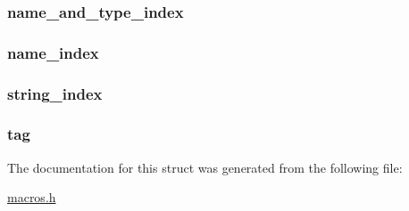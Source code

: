 \subsubsection[{name\+\_\+and\+\_\+type\+\_\+index}]{ name\+\_\+and\+\_\+type\+\_\+index}\label{structcp__info_adec52fa6971122714e8d390dd4b38048}
\hypertarget{structcp__info_ae939ac3ca00f5727beaa02d0e339183d}{}
\subsubsection[{name\+\_\+index}]{ name\+\_\+index}\label{structcp__info_ae939ac3ca00f5727beaa02d0e339183d}
\hypertarget{structcp__info_a983a5b138b680d917526211445dbcdbf}{}
\subsubsection[{string\+\_\+index}]{ string\+\_\+index}\label{structcp__info_a983a5b138b680d917526211445dbcdbf}
\hypertarget{structcp__info_a17726ed17c64ec8550633ebf17fd1a98}{}
\subsubsection[{tag}]{ tag}\label{structcp__info_a17726ed17c64ec8550633ebf17fd1a98}


The documentation for this struct was generated from the following file\+:\begin{DoxyCompactItemize}
\item 
\hyperlink{macros_8h}{macros.\+h}\end{DoxyCompactItemize}
